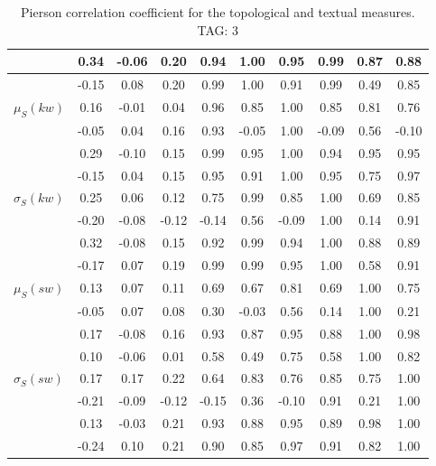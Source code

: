 \begin{table*}[h!]
\begin{center}
\begin{tabular}{| l | c | c | c | c | c | c | c | c | c |}
 & 0.34  & -0.06  & 0.20  & 0.94  & 1.00  & 0.95  & 0.99  & 0.87  & 0.88 \\\hline
 & -0.15  & 0.08  & 0.20  & 0.99  & 1.00  & 0.91  & 0.99  & 0.49  & 0.85 \\\hline
$\mu_S(kw)$ & 0.16  & -0.01  & 0.04  & 0.96  & 0.85  & 1.00  & 0.85  & 0.81  & 0.76 \\\hline
 & -0.05  & 0.04  & 0.16  & 0.93  & -0.05  & 1.00  & -0.09  & 0.56  & -0.10 \\\hline
 & 0.29  & -0.10  & 0.15  & 0.99  & 0.95  & 1.00  & 0.94  & 0.95  & 0.95 \\\hline
 & -0.15  & 0.04  & 0.15  & 0.95  & 0.91  & 1.00  & 0.95  & 0.75  & 0.97 \\\hline
$\sigma_S(kw)$ & 0.25  & 0.06  & 0.12  & 0.75  & 0.99  & 0.85  & 1.00  & 0.69  & 0.85 \\\hline
 & -0.20  & -0.08  & -0.12  & -0.14  & 0.56  & -0.09  & 1.00  & 0.14  & 0.91 \\\hline
 & 0.32  & -0.08  & 0.15  & 0.92  & 0.99  & 0.94  & 1.00  & 0.88  & 0.89 \\\hline
 & -0.17  & 0.07  & 0.19  & 0.99  & 0.99  & 0.95  & 1.00  & 0.58  & 0.91 \\\hline
$\mu_S(sw)$ & 0.13  & 0.07  & 0.11  & 0.69  & 0.67  & 0.81  & 0.69  & 1.00  & 0.75 \\\hline
 & -0.05  & 0.07  & 0.08  & 0.30  & -0.03  & 0.56  & 0.14  & 1.00  & 0.21 \\\hline
 & 0.17  & -0.08  & 0.16  & 0.93  & 0.87  & 0.95  & 0.88  & 1.00  & 0.98 \\\hline
 & 0.10  & -0.06  & 0.01  & 0.58  & 0.49  & 0.75  & 0.58  & 1.00  & 0.82 \\\hline
$\sigma_S(sw)$ & 0.17  & 0.17  & 0.22  & 0.64  & 0.83  & 0.76  & 0.85  & 0.75  & 1.00 \\\hline
 & -0.21  & -0.09  & -0.12  & -0.15  & 0.36  & -0.10  & 0.91  & 0.21  & 1.00 \\\hline
 & 0.13  & -0.03  & 0.21  & 0.93  & 0.88  & 0.95  & 0.89  & 0.98  & 1.00 \\\hline
 & -0.24  & 0.10  & 0.21  & 0.90  & 0.85  & 0.97  & 0.91  & 0.82  & 1.00 \\\hline
\end{tabular}
\caption{Pierson correlation coefficient for the topological and textual measures. TAG: 3}
\end{center}
\end{table*}